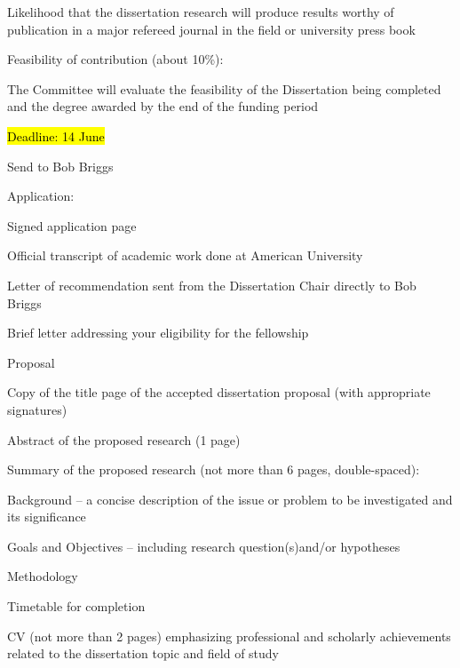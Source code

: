 \begin{coi}
\begin{coi}
\begin{coi}
						\item Likelihood that the dissertation research will produce results worthy of publication in a major refereed journal in the field or university press book
					\end{coi}
				\item Feasibility of contribution (about 10\%):
					\begin{coi}
						\item The Committee will evaluate the feasibility of the Dissertation being completed and the degree awarded by the end of the funding period
					\end{coi}
			\end{coi}
		\item \hl{Deadline: 14 June}
		\item Send to Bob Briggs
		\item Application:
			\begin{coi}
				\item Signed application page
				\item Official transcript of academic work done at American University
				\item Letter of recommendation sent from the Dissertation Chair directly to Bob Briggs
				\item Brief letter addressing your eligibility for the fellowship
				\item Proposal
					\begin{coi}
						\item Copy of the title page of the accepted dissertation proposal (with appropriate signatures)
						\item Abstract of the proposed research (1 page)
						\item Summary of the proposed research (not more than 6 pages, double-spaced):
							\begin{coi}
								\item Background -- a concise description of the issue or problem to be investigated and its significance
								\item Goals and Objectives -- including research question(s)and/or hypotheses
								\item Methodology
								\item Timetable for completion
							\end{coi}
						\item CV (not more than 2 pages) emphasizing professional and scholarly achievements related to the dissertation topic and field of study
					\end{coi}
			\end{coi}
	\end{coi}




